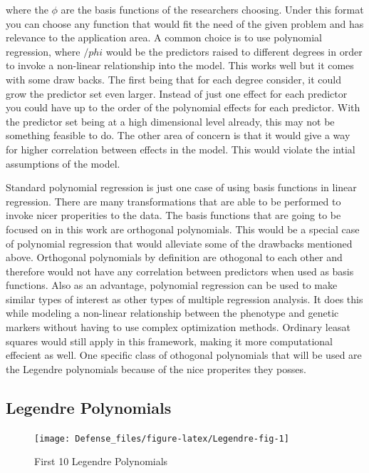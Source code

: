 \documentclass[11pt,]{book}
\theoremstyle{definition}
\theoremstyle{definition}
\theoremstyle{remark}
\begin{document}
where the \(\phi\) are the basis functions of the researchers choosing.
Under this format you can choose any function that would fit the need of
the given problem and has relevance to the application area. A common
choice is to use polynomial regression, where \(/phi\) would be the
predictors raised to different degrees in order to invoke a non-linear
relationship into the model. This works well but it comes with some draw
backs. The first being that for each degree consider, it could grow the
predictor set even larger. Instead of just one effect for each predictor
you could have up to the order of the polynomial effects for each
predictor. With the predictor set being at a high dimensional level
already, this may not be something feasible to do. The other area of
concern is that it would give a way for higher correlation between
effects in the model. This would violate the intial assumptions of the
model.

Standard polynomial regression is just one case of using basis functions
in linear regression. There are many transformations that are able to be
performed to invoke nicer properities to the data. The basis functions
that are going to be focused on in this work are orthogonal polynomials.
This would be a special case of polynomial regression that would
alleviate some of the drawbacks mentioned above. Orthogonal polynomials
by definition are othogonal to each other and therefore would not have
any correlation between predictors when used as basis functions. Also as
an advantage, polynomial regression can be used to make similar types of
interest as other types of multiple regression analysis. It does this
while modeling a non-linear relationship between the phenotype and
genetic markers without having to use complex optimization methods.
Ordinary leasat squares would still apply in this framework, making it
more computational effecient as well. One specific class of othogonal
polynomials that will be used are the Legendre polynomials because of
the nice properites they posses.

\subsection{Legendre Polynomials}\label{legendre-polynomials}

\begin{figure}

{\centering \texttt{[image: Defense\_files/figure-latex/Legendre-fig-1]} 

}

\caption{First 10 Legendre Polynomials}\label{fig:Legendre-fig}
\end{figure}
\end{document}
